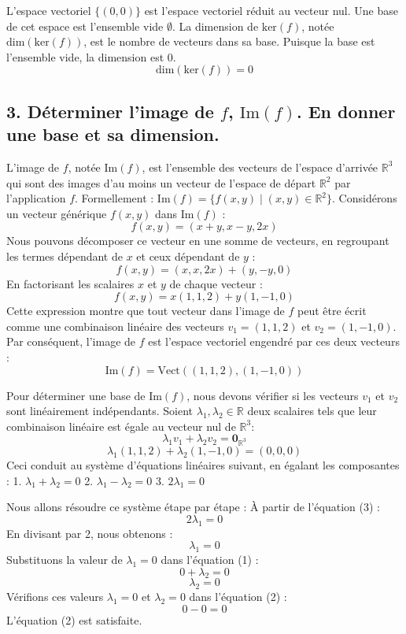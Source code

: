 \documentclass{report}
\begin{document}
L'espace vectoriel $\{(0,0)\}$ est l'espace vectoriel réduit au vecteur nul. Une base de cet espace est l'ensemble vide $\emptyset$.
La dimension de $\text{ker}(f)$, notée $\text{dim}(\text{ker}(f))$, est le nombre de vecteurs dans sa base. Puisque la base est l'ensemble vide, la dimension est 0.
$$\text{dim}(\text{ker}(f)) = 0$$

\subsection*{3. Déterminer l'image de $f$, $\text{Im}(f)$. En donner une base et sa dimension.}

L'image de $f$, notée $\text{Im}(f)$, est l'ensemble des vecteurs de l'espace d'arrivée $\mathbb{R}^3$ qui sont des images d'au moins un vecteur de l'espace de départ $\mathbb{R}^2$ par l'application $f$.
Formellement : $\text{Im}(f) = \{ f(x,y) \mid (x,y) \in \mathbb{R}^2 \}$.
Considérons un vecteur générique $f(x,y)$ dans $\text{Im}(f)$ :
$$f(x,y) = (x+y, x-y, 2x)$$
Nous pouvons décomposer ce vecteur en une somme de vecteurs, en regroupant les termes dépendant de $x$ et ceux dépendant de $y$ :
$$f(x,y) = (x, x, 2x) + (y, -y, 0)$$
En factorisant les scalaires $x$ et $y$ de chaque vecteur :
$$f(x,y) = x(1,1,2) + y(1,-1,0)$$
Cette expression montre que tout vecteur dans l'image de $f$ peut être écrit comme une combinaison linéaire des vecteurs $v_1 = (1,1,2)$ et $v_2 = (1,-1,0)$.
Par conséquent, l'image de $f$ est l'espace vectoriel engendré par ces deux vecteurs :
$$\text{Im}(f) = \text{Vect}((1,1,2), (1,-1,0))$$

Pour déterminer une base de $\text{Im}(f)$, nous devons vérifier si les vecteurs $v_1$ et $v_2$ sont linéairement indépendants.
Soient $\lambda_1, \lambda_2 \in \mathbb{R}$ deux scalaires tels que leur combinaison linéaire est égale au vecteur nul de $\mathbb{R}^3$:
$$\lambda_1 v_1 + \lambda_2 v_2 = \mathbf{0}_{\mathbb{R}^3}$$
$$\lambda_1(1,1,2) + \lambda_2(1,-1,0) = (0,0,0)$$
Ceci conduit au système d'équations linéaires suivant, en égalant les composantes :
1.  $\lambda_1 + \lambda_2 = 0$
2.  $\lambda_1 - \lambda_2 = 0$
3.  $2\lambda_1 = 0$

Nous allons résoudre ce système étape par étape :
À partir de l'équation (3) :
$$2\lambda_1 = 0$$
En divisant par 2, nous obtenons :
$$\lambda_1 = 0$$
Substituons la valeur de $\lambda_1=0$ dans l'équation (1) :
$$0 + \lambda_2 = 0$$
$$\lambda_2 = 0$$
Vérifions ces valeurs $\lambda_1=0$ et $\lambda_2=0$ dans l'équation (2) :
$$0 - 0 = 0$$
L'équation (2) est satisfaite.
\end{document}
